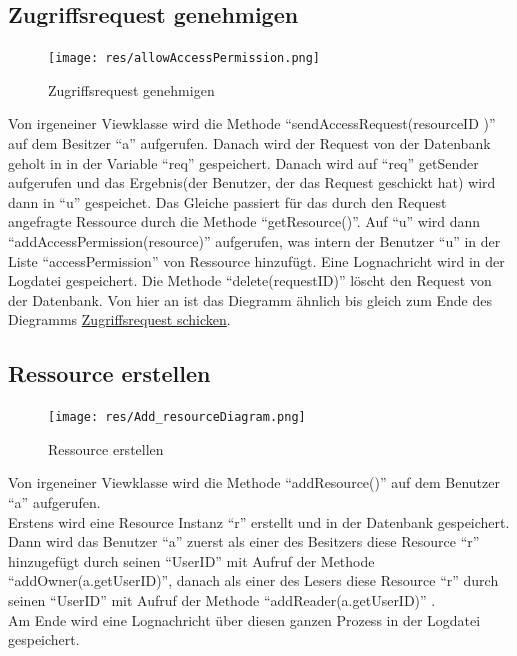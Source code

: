 \documentclass[parskip=full,11pt]{scrartcl}
\begin{document}
  \newpage
 \subsection{Zugriffsrequest genehmigen}
 \begin{figure}[ht!]
 	\centering
 	\texttt{[image: res/allowAccessPermission.png]}
 	\caption{Zugriffsrequest genehmigen}
 \end{figure}
 
 Von irgeneiner Viewklasse wird die Methode \enquote{sendAccessRequest(resourceID )} auf dem Besitzer \enquote{a}  aufgerufen. Danach wird der Request von der Datenbank geholt in in der Variable \enquote{req} gespeichert. Danach wird auf \enquote{req} getSender aufgerufen und das Ergebnis(der Benutzer, der das Request geschickt hat) wird dann in \enquote{u} gespeichet. Das Gleiche passiert für das durch den Request angefragte Ressource durch die Methode \enquote{getResource()}. Auf \enquote{u} wird dann \enquote{addAccessPermission(resource)} aufgerufen, was intern der Benutzer \enquote{u} in der Liste \enquote{accessPermission} von Ressource hinzufügt. Eine Lognachricht wird in der Logdatei gespeichert. Die Methode \enquote{delete(requestID)} löscht den Request von der Datenbank. Von hier an ist das Diegramm ähnlich bis gleich zum Ende des Diegramms \hyperref[fig:sendAccReq]{Zugriffsrequest schicken}. 
 
  \newpage
 \subsection{Ressource erstellen}
 \begin{figure}[ht!]
 	\centering
 	\texttt{[image: res/Add\_resourceDiagram.png]}
 	\caption{Ressource erstellen}
 \end{figure}
 
Von irgeneiner Viewklasse wird die Methode \enquote{addResource()} auf dem Benutzer \enquote{a}  aufgerufen.\\ Erstens wird eine Resource Instanz \enquote{r} erstellt und in der Datenbank gespeichert.\\ Dann wird das Benutzer \enquote{a} zuerst als einer des Besitzers diese Resource \enquote{r} hinzugefügt durch seinen \enquote{UserID} mit Aufruf der Methode \enquote{addOwner(a.getUserID)}, danach als einer des Lesers diese Resource \enquote{r} durch seinen \enquote{UserID} mit Aufruf der Methode \enquote{addReader(a.getUserID)} .\\Am Ende wird eine Lognachricht über diesen ganzen Prozess  in der Logdatei gespeichert.
\end{document}
